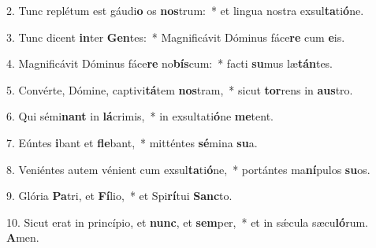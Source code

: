 2. Tunc replétum est gáudi\textbf{o} os \textbf{nos}trum:~*  et lingua nostra exsul\textbf{ta}ti\textbf{ó}ne.\

3. Tunc dicent \textbf{in}ter \textbf{Gen}tes:~*  Magnificávit Dóminus fáce\textbf{re} cum \textbf{e}is.\

4. Magnificávit Dóminus fáce\textbf{re} no\textbf{bís}cum:~*  facti \textbf{su}mus læ\textbf{tán}tes.\

5. Convérte, Dómine, captivi\textbf{tá}tem \textbf{nos}tram,~*  sicut \textbf{tor}rens in \textbf{aus}tro.\

6. Qui sémi\textbf{nant} in \textbf{lá}crimis,~*  in exsultati\textbf{ó}ne \textbf{me}tent.\

7. Eúntes \textbf{i}bant et \textbf{fle}bant,~*  mitténtes \textbf{sé}mina \textbf{su}a.\

8. Veniéntes autem vénient cum exsul\textbf{ta}ti\textbf{ó}ne,~*  portántes ma\textbf{ní}pulos \textbf{su}os.\

9. Glória \textbf{Pa}tri, et \textbf{Fí}lio,~*  et Spi\textbf{rí}tui \textbf{Sanc}to.\

10. Sicut erat in princípio, et \textbf{nunc}, et \textbf{sem}per,~*  et in sǽcula sæcu\textbf{ló}rum. \textbf{A}men.\

